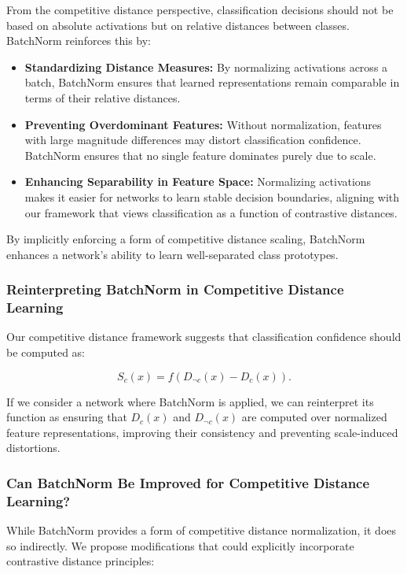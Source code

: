From the competitive distance perspective, classification decisions should not be based on absolute activations but on relative distances between classes. BatchNorm reinforces this by:

\begin{itemize}
    \item \textbf{Standardizing Distance Measures:} By normalizing activations across a batch, BatchNorm ensures that learned representations remain comparable in terms of their relative distances.
    \item \textbf{Preventing Overdominant Features:} Without normalization, features with large magnitude differences may distort classification confidence. BatchNorm ensures that no single feature dominates purely due to scale.
    \item \textbf{Enhancing Separability in Feature Space:} Normalizing activations makes it easier for networks to learn stable decision boundaries, aligning with our framework that views classification as a function of contrastive distances.
\end{itemize}

By implicitly enforcing a form of competitive distance scaling, BatchNorm enhances a network's ability to learn well-separated class prototypes.

\subsubsection{Reinterpreting BatchNorm in Competitive Distance Learning}

Our competitive distance framework suggests that classification confidence should be computed as:

\[
S_c(x) = f(D_{\neg c}(x) - D_c(x)).
\]

If we consider a network where BatchNorm is applied, we can reinterpret its function as ensuring that \( D_c(x) \) and \( D_{\neg c}(x) \) are computed over normalized feature representations, improving their consistency and preventing scale-induced distortions.

\subsubsection{Can BatchNorm Be Improved for Competitive Distance Learning?}

While BatchNorm provides a form of competitive distance normalization, it does so indirectly. We propose modifications that could explicitly incorporate contrastive distance principles:

